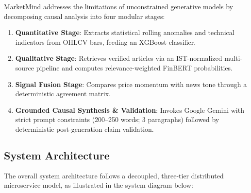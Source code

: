 \documentclass{article}
\begin{document}
	MarketMind addresses the limitations of unconstrained generative models by decomposing causal analysis into four modular stages:
	\begin{enumerate}
		\item \textbf{Quantitative Stage}: Extracts statistical rolling anomalies and technical indicators from OHLCV bars, feeding an XGBoost classifier.
		\item \textbf{Qualitative Stage}: Retrieves verified articles via an IST-normalized multi-source pipeline and computes relevance-weighted FinBERT probabilities.
		\item \textbf{Signal Fusion Stage}: Compares price momentum with news tone through a deterministic agreement matrix.
		\item \textbf{Grounded Causal Synthesis \& Validation}: Invokes Google Gemini with strict prompt constraints (200--250 words; 3 paragraphs) followed by deterministic post-generation claim validation.
	\end{enumerate}

	\subsection{System Architecture}

	The overall system architecture follows a decoupled, three-tier distributed microservice model, as illustrated in the system diagram below:
\end{document}

